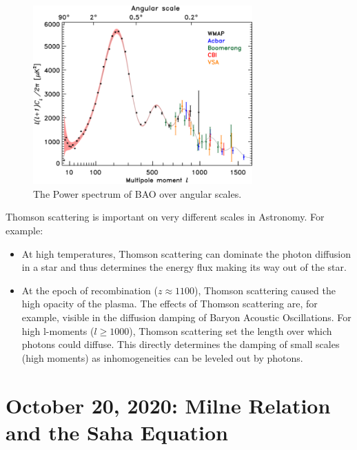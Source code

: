 \documentclass{article}
\begin{document}
\begin{figure}
    \centering
    \includegraphics[width=0.75\textwidth]{figures/736px-BAO.png}
    \caption{The Power spectrum of BAO over angular scales.}
    \label{fig:BAO}
\end{figure}

Thomson scattering is important on very different scales in Astronomy. For example:

\begin{itemize}
    \item At high temperatures, Thomson scattering can dominate the photon diffusion in a star and thus determines the energy flux making its way out of the star.
    \item At the epoch of recombination ($z \approx 1100$), Thomson scattering caused the high opacity of the plasma. The effects of Thomson scattering are, for example, visible in the diffusion damping of Baryon Acoustic Oscillations. For high l-moments ($l\geq 1000$), Thomson scattering set the length over which photons could diffuse. This directly determines the damping of small scales (high moments) as inhomogeneities can be leveled out by photons.

\end{itemize}


\newpage
\section{October 20, 2020: Milne Relation and the Saha Equation}
\end{document}
